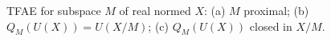 TFAE for subspace $M$ of real normed $X$: (a) $M$ proximal; (b) $Q_M(U(X))=U(X/M)$; (c) $Q_M(U(X))$ closed in $X/M$.
